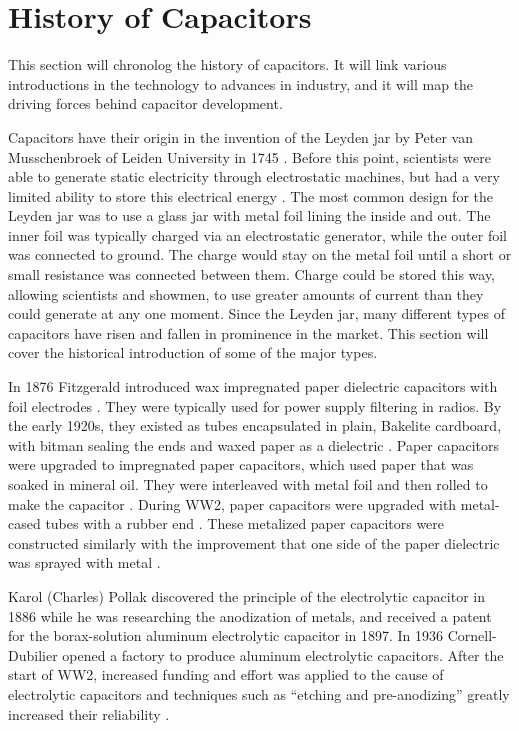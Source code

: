 \section {History of Capacitors}
\label{sec:history}

This section will chronolog the history of capacitors. It will link various introductions in the technology to advances in industry, and it will map the driving forces behind capacitor development.

Capacitors have their origin in the invention of the Leyden jar by Peter van Musschenbroek of Leiden University in 1745 \cite{empLight}. Before this point, scientists were able to generate static electricity through electrostatic machines, but had a very limited ability to store this electrical energy \cite{ieee_hist}.
The most common design for the Leyden jar was to use a glass jar with metal foil lining the inside and out. The inner foil was typically charged via an electrostatic generator, while the outer foil was connected to ground. The charge would stay on the metal foil until a short or small resistance was connected between them. Charge could be stored this way, allowing scientists and showmen, to use greater amounts of current than they could generate at any one moment.
Since the Leyden jar, many different types of capacitors have risen and fallen in prominence in the market. This section will cover the historical introduction of some of the major types.

In 1876 Fitzgerald introduced wax impregnated paper dielectric capacitors with foil electrodes \cite[ch.~11]{dumInv}\cite{learn_caps}. They were typically used for power supply filtering in radios. By the early 1920s, they existed as tubes encapsulated in plain, Bakelite cardboard, with bitman sealing the ends and waxed paper as a dielectric \cite[ch~3]{dumInv}.
Paper capacitors were upgraded to impregnated paper capacitors, which used paper that was soaked in mineral oil. They were interleaved with metal foil and then rolled to make the capacitor \cite[ch.~8.2.1.1]{poorIntro}. During WW2, paper capacitors were upgraded with metal-cased tubes with a rubber end \cite[ch.~8.1]{poorIntro}. These metalized paper capacitors were constructed similarly with the improvement that one side of the paper dielectric was sprayed with metal \cite{hist_cerFilt}.

Karol (Charles) Pollak discovered the principle of the electrolytic capacitor in 1886 while he was researching the anodization of metals, and received a patent for the borax-solution aluminum electrolytic capacitor in 1897.  
In 1936 Cornell-Dubilier opened a factory to produce aluminum electrolytic capacitors. 
After the start of WW2, increased funding and effort was applied to the cause of electrolytic capacitors and techniques such as ``etching and pre-anodizing'' greatly increased their reliability \cite{deis_hist}\cite{wiki_elec}.

